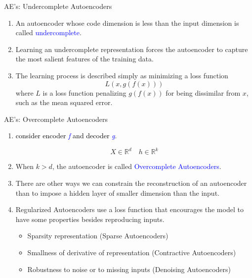 \documentclass[serif, aspectratio=169]{beamer}
\begin{document}
\begin{frame}{AE’s: Undercomplete Autoencoders}
    \begin{enumerate}
        \item An autoencoder whose code dimension is less than the input dimension is called \textcolor{blue}{undercomplete}.
        \vspace{0.3cm}
        
        \item Learning an undercomplete representation forces the autoencoder to capture the most salient features of the training data.
        \vspace{0.3cm}
        
        \item The learning process is described simply as minimizing a loss function
        \begin{equation*}
            L(x, g(f(x)))
        \end{equation*}
        where \( L \) is a loss function penalizing \( g(f(x)) \) for being dissimilar from \( x \), such as the mean squared error.
    \end{enumerate}
\end{frame}

\begin{frame}{AE’s: Overcomplete Autoencoders}
\small
    \begin{enumerate}
        \item \textcolor{black}{consider encoder} \textit{\textcolor{blue}{f}} \textcolor{black}{and decoder} \textit{\textcolor{blue}{g}}.
        
        \begin{equation*}
            X \in \mathbb{R}^d \quad h \in \mathbb{R}^k
        \end{equation*}
        
        \vspace{0.15cm}
        \item When \( k > d \), the autoencoder is called \textcolor{blue}{Overcomplete Autoencoders}.
        
        \vspace{0.2cm}
        \item There are other ways we can constrain the reconstruction of an autoencoder than to impose a hidden layer of smaller dimension than the input.
        
        \vspace{0.2cm}
        \item Regularized Autoencoders use a loss function that encourages the model to have some properties besides reproducing inputs.
        \begin{itemize}
            \item Sparsity representation (Sparse Autoencoders)
            \item Smallness of derivative of representation (Contractive Autoencoders)
            \item Robustness to noise or to missing inputs (Denoising Autoencoders)
        \end{itemize}
    \end{enumerate}
\end{frame}
\end{document}
